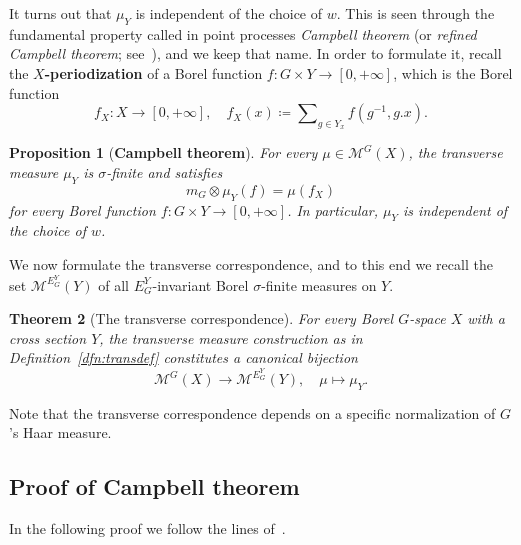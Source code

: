 \documentclass{amsart}
\numberwithin{equation}{subsection}
\newtheorem{thm}{Theorem}[section]
\newtheorem{prop}[thm]{Proposition}
\theoremstyle{remark}
\begin{document}
It turns out that \(\mu_{Y}\) is independent of the choice of \(w\). This is seen through the fundamental property called in point processes \emph{Campbell theorem} (or \emph{refined Campbell theorem}; see~\cite{last2009}), and we keep that name. In order to formulate it, recall the \(X\){\bf-periodization} of a Borel function \(f:G\times Y\to\left[0,+\infty\right]\), which is the Borel function
\[f_{X}:X\longrightarrow\left[0,+\infty\right],\quad f_{X}\left(x\right)\coloneqq \sum\nolimits_{g\in Y_{x}}f\left(g^{-1},g.x\right).\]

\begin{prop}[{\bf Campbell theorem}]\label{prop:campbell}
For every \(\mu\in\mathcal{M}^{G}\left(X\right)\), the transverse measure \(\mu_{Y}\) is \(\sigma\)-finite and satisfies
\[m_{G}\otimes\mu_{Y}\left(f\right)=\mu\left(f_{X}\right)\]
for every Borel function \(f:G\times Y\to\left[0,+\infty\right]\). In particular, \(\mu_{Y}\) is independent of the choice of \(w\).
\end{prop}

We now formulate the transverse correspondence, and to this end we recall the set \(\mathcal{M}^{E_{G}^{Y}}\left(Y\right)\) of all \(E_{G}^{Y}\)-invariant Borel \(\sigma\)-finite measures on \(Y\).

\begin{thm}[The transverse correspondence]\label{thm:corresp}
For every Borel \(G\)-space \(X\) with a cross section \(Y\), the transverse measure construction as in Definition~\ref{dfn:transdef} constitutes a canonical bijection
\[\mathcal{M}^{G}\left(X\right)\longrightarrow\mathcal{M}^{E_{G}^{Y}}\left(Y\right),\quad\mu\mapsto\mu_{Y}.\]
\end{thm}

Note that the transverse correspondence depends on a specific normalization of \(G\)'s Haar measure.

\subsection{Proof of Campbell theorem}

In the following proof we follow the lines of~\cite[Theorem 3.6]{last2009}.
\end{document}
